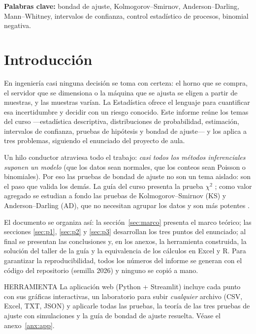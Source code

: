 \documentclass[11pt]{article}
\begin{document}
{\sloppy\textbf{Palabras clave:} bondad de ajuste, Kolmogorov–Smirnov, Anderson–Darling, Mann–Whitney, intervalos de
confianza, control estadístico de procesos, binomial negativa.\par}

\newpage
{\small\sans{}\tableofcontents}

\newpage
{}
\section*{Introducción}
En ingeniería casi ninguna decisión se toma con certeza: el horno que se compra, el servidor que se dimensiona o
la máquina que se ajusta se eligen a partir de muestras, y las muestras varían. La Estadística ofrece el lenguaje
para cuantificar esa incertidumbre y decidir con un riesgo conocido. Este informe reúne los temas del curso
—estadística descriptiva, distribuciones de probabilidad, estimación, intervalos de confianza, pruebas de hipótesis
y bondad de ajuste— y los aplica a tres problemas, siguiendo el enunciado del proyecto de aula.

Un hilo conductor atraviesa todo el trabajo: \emph{casi todos los métodos inferenciales suponen un modelo} (que
los datos sean normales, que los conteos sean Poisson o binomiales). Por eso las pruebas de bondad de ajuste no
son un tema aislado: son el paso que valida los demás. La guía del curso presenta la prueba $\chi^2$
\cite{guia}; como valor agregado se estudian a fondo las pruebas de Kolmogorov–Smirnov (KS) y Anderson–Darling
(AD), que no necesitan agrupar los datos y son más potentes \cite{stephens,razali}.

El documento se organiza así: la sección~\ref{sec:marco} presenta el marco teórico; las secciones
\ref{sec:p1}, \ref{sec:p2} y \ref{sec:p3} desarrollan los tres puntos del enunciado; al final se presentan las
conclusiones y, en los anexos, la herramienta construida, la solución del taller de la guía y la equivalencia de
los cálculos en Excel y R. Para garantizar la reproducibilidad, todos los números del informe se generan con el
código del repositorio (semilla 2026) y ninguno se copió a mano.

\begin{idea}{HERRAMIENTA}
La aplicación web (Python + Streamlit) incluye cada punto con sus gráficas interactivas, un laboratorio para
subir \emph{cualquier} archivo (CSV, Excel, TXT, JSON) y aplicarle todas las pruebas, la teoría de las tres pruebas
de ajuste con simulaciones y la guía de bondad de ajuste resuelta. Véase el anexo~\ref{anx:app}.
\end{idea}
\end{document}
